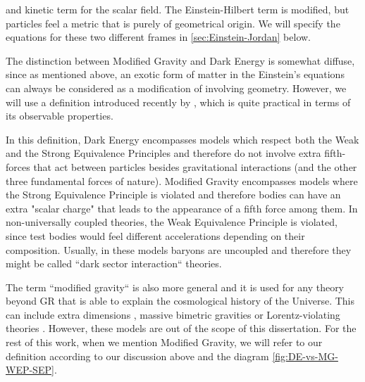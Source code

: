 and kinetic term for the scalar field. 
The Einstein-Hilbert term is modified, but particles feel a metric that is purely of geometrical origin. 
We will specify the equations for these two different frames in
\cref{sec:Einstein-Jordan} below.


The distinction between Modified Gravity and Dark Energy is somewhat diffuse, since as mentioned above, 
an exotic form of matter in the Einstein's equations can always be considered as a modification 
of involving geometry. However, we will use a definition introduced recently by \cite{joyce_dark_2016-2}, 
which is quite practical in terms of its observable properties. 

In this definition, Dark Energy encompasses models which respect both the Weak and the Strong Equivalence
Principles and therefore do not involve extra fifth-forces that act between particles besides gravitational 
interactions (and the other three fundamental forces of nature). 
Modified Gravity encompasses models where the Strong Equivalence Principle is violated and therefore 
bodies can have an extra "scalar charge" that leads to the appearance of a fifth force among them.
In non-universally coupled theories, the Weak Equivalence Principle is violated,
since test bodies would feel different accelerations depending on
their composition. Usually, in these models baryons are uncoupled and therefore they might be called ``dark sector interaction`` theories.


The term ``modified gravity`` is also more general and it is used for
any theory beyond GR that is able to explain the cosmological history
of the Universe. This can include extra dimensions \cite{deffayet2002accelerated},
massive bimetric gravities \cite{akrami2015bimetric, konnig2014stable} or Lorentz-violating theories
\cite{blas2011models}. However, these models are out of the scope of this dissertation. 
For the rest of this work, when we mention Modified Gravity, we will refer to our definition according
to our discussion above and the diagram \ref{fig:DE-vs-MG-WEP-SEP}.

